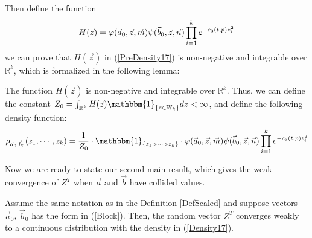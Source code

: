 Then define the function 
\begin{align}{\label{PreDensity17}}
	H(\vec{z})=\varphi(\vec{a}_{0},\vec{z},\vec{m})\psi(\vec{b}_{0},\vec{z},\vec{n})\prod_{i=1}^{k}e^{-c_{3}(t,p)z_{i}^{2}}
\end{align}
we can prove that $H(\vec{z})$ in (\ref{PreDensity17}) is non-negative and integrable over $\mathbb{R}^{k}$, which is formalized in the following lemma:
\begin{lemma}{\label{Integrable}}
	The function $H(\vec{z})$ is non-negative and integrable over $\mathbb{R}^{k}$. Thus, we can define the constant $Z_{0}=\int_{\mathbb{R}^{k}}H(\vec{z})\mathbbm{1}_{\{z\in\mathbb{W}_{k}\}}dz<\infty$, and define the following density function:
\begin{align}{\label{Density17}}
\rho_{\vec{a}_{0},\vec{b}_{0}}(z_{1},\cdots,z_{k})=\frac{1}{Z_{0}}\cdot\mathbbm{1}_{\{z_{1}>\cdots> z_{k}\}}\cdot \varphi(\vec{a}_{0},\vec{z},\vec{m})\psi(\vec{b}_{0},\vec{z},\vec{n})\prod_{i=1}^{k}e^{-c_{3}(t,p)z_{i}^{2}}	
\end{align}
\end{lemma}
Now we are ready to state our second main result, which gives the weak convergence of $Z^{T}$ when $\vec{a}$ and $\vec{b}$ have collided values.
\begin{proposition}{\label{WeakConvCollide}}
Assume the same notation as in the Definition \ref{DefScaled} and suppose vectors $\vec{a}_{0}$, $\vec{b}_{0}$ has the form in (\ref{Block}). Then, the random vector $Z^{T}$ converges weakly to a continuous distribution with the density in (\ref{Density17}).
\end{proposition}

